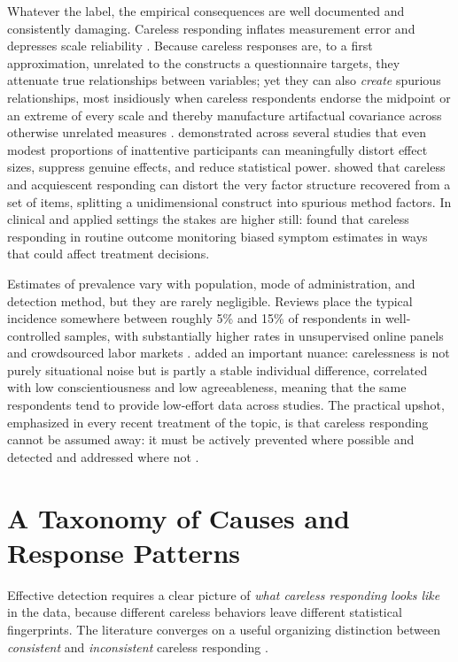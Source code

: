 Whatever the label, the empirical consequences are well documented and
consistently damaging. Careless responding inflates measurement error and
depresses scale reliability \parencite{huang2012detecting}. Because careless
responses are, to a first approximation, unrelated to the constructs a
questionnaire targets, they attenuate true relationships between variables; yet
they can also \emph{create} spurious relationships, most insidiously when
careless respondents endorse the midpoint or an extreme of every scale and
thereby manufacture artifactual covariance across otherwise unrelated measures
\parencite{huang2015insufficient}. \textcite{maniaci2014caring} demonstrated
across several studies that even modest proportions of inattentive participants
can meaningfully distort effect sizes, suppress genuine effects, and reduce
statistical power. \textcite{kam2015careless} showed that careless and
acquiescent responding can distort the very factor structure recovered from a
set of items, splitting a unidimensional construct into spurious method
factors. In clinical and applied settings the stakes are higher still:
\textcite{conijn2019assessment} found that careless responding in routine
outcome monitoring biased symptom estimates in ways that could affect treatment
decisions.

Estimates of prevalence vary with population, mode of administration, and
detection method, but they are rarely negligible. Reviews place the typical
incidence somewhere between roughly 5\% and 15\% of respondents in
well-controlled samples, with substantially higher rates in unsupervised online
panels and crowdsourced labor markets \parencite{ward2023dealing,
meade2012identifying, curran2016methods}. \textcite{bowling2016who} added an
important nuance: carelessness is not purely situational noise but is partly a
stable individual difference, correlated with low conscientiousness and low
agreeableness, meaning that the same respondents tend to provide low-effort data
across studies. The practical upshot, emphasized in every recent treatment of
the topic, is that careless responding cannot be assumed away: it must be
actively prevented where possible and detected and addressed where not
\parencite{desimone2015best, desimone2018dirty, ward2023dealing}.

\section{A Taxonomy of Causes and Response Patterns}

Effective detection requires a clear picture of \emph{what careless responding
looks like} in the data, because different careless behaviors leave different
statistical fingerprints. The literature converges on a useful organizing
distinction between \emph{consistent} and \emph{inconsistent} careless
responding \parencite{ward2023dealing, curran2016methods}.

